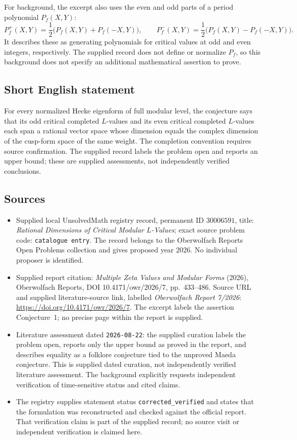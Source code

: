 \documentclass[11pt]{article}
\begin{document}
For background, the excerpt also uses the even and odd parts of a period polynomial \(P_f(X,Y)\):
\[
P_f^+(X,Y)=\frac12\bigl(P_f(X,Y)+P_f(-X,Y)\bigr),\qquad
P_f^-(X,Y)=\frac12\bigl(P_f(X,Y)-P_f(-X,Y)\bigr).
\]
It describes these as generating polynomials for critical values at odd and even integers, respectively. The supplied record does not define or normalize \(P_f\), so this background does not specify an additional mathematical assertion to prove.
\subsection{Short English statement}
For every normalized Hecke eigenform of full modular level, the conjecture says that its odd critical completed \(L\)-values and its even critical completed \(L\)-values each span a rational vector space whose dimension equals the complex dimension of the cusp-form space of the same weight. The completion convention requires source confirmation. The supplied record labels the problem open and reports an upper bound; these are supplied assessments, not independently verified conclusions.
\subsection{Sources}
\begin{itemize}
\item Supplied local UnsolvedMath registry record, permanent ID \(30006591\), title: \emph{Rational Dimensions of Critical Modular \(L\)-Values}; exact source problem code: \texttt{catalogue entry}. The record belongs to the Oberwolfach Reports Open Problems collection and gives proposed year 2026. No individual proposer is identified.
\item Supplied report citation: \emph{Multiple Zeta Values and Modular Forms} (2026), Oberwolfach Reports, DOI 10.4171/owr/2026/7, pp.~433--486. Source URL and supplied literature-source link, labelled \emph{Oberwolfach Report 7/2026}: \url{https://doi.org/10.4171/owr/2026/7}. The excerpt labels the assertion Conjecture~1; no precise page within the report is supplied.
\item Literature assessment dated \texttt{2026-08-22}: the supplied curation labels the problem open, reports only the upper bound as proved in the report, and describes equality as a folklore conjecture tied to the unproved Maeda conjecture. This is supplied dated curation, not independently verified literature assessment. The background explicitly requests independent verification of time-sensitive status and cited claims.
\item The registry supplies statement status \texttt{corrected\_verified} and states that the formulation was reconstructed and checked against the official report. That verification claim is part of the supplied record; no source visit or independent verification is claimed here.
\end{itemize}
\end{document}
